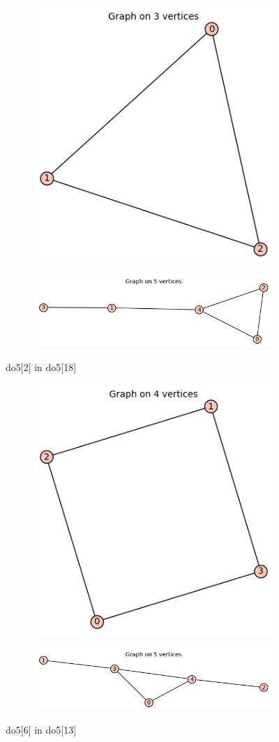 \documentclass[12pt, a4paper]{article}
\begin{document}
\begin{center}
\begin{figure}[!htb]
\centering
\begin{subfigure}{0.5\textwidth}
  \centering
  \includegraphics[width=0.5\linewidth]{do5[2]}
\end{subfigure}%
\begin{subfigure}{0.5\textwidth}
  \centering
  \includegraphics[width=0.9\linewidth]{do5[18]}
\end{subfigure}
\caption{do5[2] in do5[18]}
\label{fig:test}
\end{figure}

\begin{figure}[!htb]
\centering
\begin{subfigure}{0.5\textwidth}
  \centering
  \includegraphics[width=0.55\linewidth]{do5[6]}
\end{subfigure}%
\begin{subfigure}{0.5\textwidth}
  \centering
  \includegraphics[width=0.8\linewidth]{do5[13]}
\end{subfigure}
\caption{do5[6] in do5[13]}
\label{fig:test}
\end{figure}


\end{center}
\end{document}
